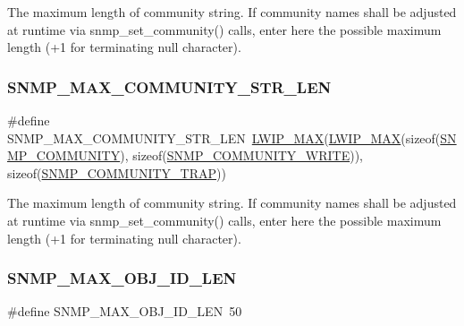 The maximum length of community string. If community names shall be adjusted at runtime via snmp\+\_\+set\+\_\+community() calls, enter here the possible maximum length (+1 for terminating null character). \mbox{\label{group__snmp__opts_ga0e98b58159a77688f87f9f50479177fd}} 
\subsubsection{\texorpdfstring{S\+N\+M\+P\+\_\+\+M\+A\+X\+\_\+\+C\+O\+M\+M\+U\+N\+I\+T\+Y\+\_\+\+S\+T\+R\+\_\+\+L\+EN}{SNMP\_MAX\_COMMUNITY\_STR\_LEN}\hspace{0.1cm}{\footnotesize\ttfamily [2/2]}}
{\footnotesize\ttfamily \#define S\+N\+M\+P\+\_\+\+M\+A\+X\+\_\+\+C\+O\+M\+M\+U\+N\+I\+T\+Y\+\_\+\+S\+T\+R\+\_\+\+L\+EN~\hyperlink{openmote-cc2538_2lwip_2src_2include_2lwip_2def_8h_a21ea174d374106caeafb4aa3a24fbd2b}{L\+W\+I\+P\+\_\+\+M\+AX}(\hyperlink{openmote-cc2538_2lwip_2src_2include_2lwip_2def_8h_a21ea174d374106caeafb4aa3a24fbd2b}{L\+W\+I\+P\+\_\+\+M\+AX}(sizeof(\hyperlink{group__snmp__opts_ga316c1e1f06f0c7ca56589563809e64db}{S\+N\+M\+P\+\_\+\+C\+O\+M\+M\+U\+N\+I\+TY}), sizeof(\hyperlink{group__snmp__opts_gafb9414dc7a33978b62a3a9838b659464}{S\+N\+M\+P\+\_\+\+C\+O\+M\+M\+U\+N\+I\+T\+Y\+\_\+\+W\+R\+I\+TE})), sizeof(\hyperlink{group__snmp__opts_gaaefc9dda5f8e5c296018a463cdbac39b}{S\+N\+M\+P\+\_\+\+C\+O\+M\+M\+U\+N\+I\+T\+Y\+\_\+\+T\+R\+AP}))}

The maximum length of community string. If community names shall be adjusted at runtime via snmp\+\_\+set\+\_\+community() calls, enter here the possible maximum length (+1 for terminating null character). \mbox{\label{group__snmp__opts_ga3ad9d293f90e3c885c4e3263a9064a41}} 
\subsubsection{\texorpdfstring{S\+N\+M\+P\+\_\+\+M\+A\+X\+\_\+\+O\+B\+J\+\_\+\+I\+D\+\_\+\+L\+EN}{SNMP\_MAX\_OBJ\_ID\_LEN}\hspace{0.1cm}{\footnotesize\ttfamily [1/2]}}
{\footnotesize\ttfamily \#define S\+N\+M\+P\+\_\+\+M\+A\+X\+\_\+\+O\+B\+J\+\_\+\+I\+D\+\_\+\+L\+EN~50}

